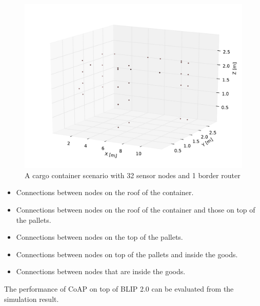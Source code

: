 \begin{figure}[htbp]
  \begin{center}
    \leavevmode
      \includegraphics[scale=0.45]
      {Pics/container.pdf}
   \caption{A cargo container scenario with 32 sensor nodes and 1 border router}
    \label{fig:container}
  \end{center}
\end{figure}


\begin{itemize}
\item Connections between nodes on the roof of the container.
\item Connections between nodes on the roof of the container and those on top of the pallets.
\item Connections between nodes on the top of the pallets.
\item Connections between nodes on top of the pallets and inside the goods.
\item Connections between nodes that are inside the goods.
\end{itemize}

The performance of CoAP on top of BLIP 2.0 can be evaluated from the simulation result.


